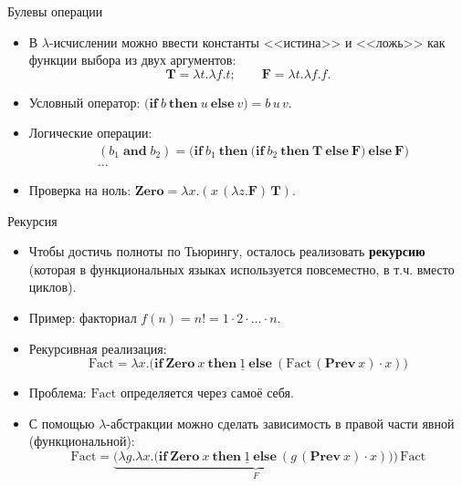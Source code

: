 \documentclass[xcolor=dvipsnames]{beamer}
\newcommand{\Fx}{\mathbf{F}}
\newcommand{\Tx}{\mathbf{T}}
\newcommand{\ifxx}[3]{\bigl(\mathbf{if}\ {#1}\ \mathbf{then}\ {#2}\ \mathbf{else}\ {#3}\bigr)}
\newcommand{\Factx}{\mathrm{Fact}}
\newcommand{\Prevx}{\mathbf{Prev}}
\begin{document}
\begin{frame}{Булевы операции}
 
 \begin{itemize}[<+->]
  \item В $\lambda$-исчислении можно ввести константы <<истина>> и <<ложь>> как функции выбора из двух аргументов:
  \[
   \Tx = \lambda t. \lambda f. t; \qquad
   \Fx = \lambda t. \lambda f. f.
  \]

  \item Условный оператор:
  \(
   \ifxx{b}{u}{v} = b\,u\, v.
  \)

  \item Логические операции:
  \begin{align*}
& (b_1 \mathop{\mathbf{and}} b_2) = 
\ifxx{b_1}{\ifxx{b_2}{\Tx}{\Fx}}{\Fx}\\
& \ldots
  \end{align*}

  \item Проверка на ноль: 
  $\mathbf{Zero} = \lambda x. (x \, (\lambda z. \Fx) \, \Tx)$.
 \end{itemize}

 
\end{frame}


\begin{frame}{Рекурсия}

\begin{itemize}[<+->]
 \item Чтобы достичь полноты по Тьюрингу, осталось реализовать {\bf рекурсию} (которая в функциональных языках используется повсеместно, в т.ч. вместо циклов).
 
 \item Пример: факториал $f(n) = n! = 1 \cdot 2 \cdot \ldots \cdot n$.
 
 \item Рекурсивная реализация:
 \[
  \Factx = \lambda x. 
  \ifxx{\mathbf{Zero}\ x}{\underline{1}}{(\Factx\,(\Prevx\ x) \cdot x)}
 \]

 \item Проблема: $\Factx$ определяется через самоё себя.
 
 \item С помощью $\lambda$-абстракции можно сделать зависимость в правой части явной (функциональной):
 \[
  \Factx = \underbrace{\bigl(\lambda g. \lambda x. 
  \ifxx{\mathbf{Zero}\ x}{\underline{1}}{(g\,(\Prevx\ x) \cdot x)} \bigr)}_F \, 
  \Factx
 \]

\end{itemize}

 
\end{frame}
\end{document}

